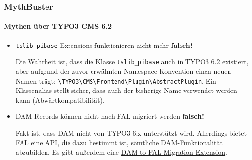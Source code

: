 \begin{frame}[fragile]
	\frametitle{MythBuster}
	\framesubtitle{Mythen über TYPO3 CMS 6.2}

	\begin{itemize}

		\item \texttt{tslib\_pibase}-Extensions funktionieren nicht mehr
			\tabto{9cm}\color{red}\textbf{\textrightarrow falsch!}\color{black}

			\smaller
				Die Wahrheit ist, dass die Klasse \texttt{tslib\_pibase} auch in TYPO3 6.2 existiert, aber aufgrund der zuvor erwähnten Namespace-Konvention einen neuen Namen trägt: \texttt{\textbackslash TYPO3\textbackslash CMS\textbackslash Frontend\textbackslash Plugin\textbackslash AbstractPlugin}.\newline
				Ein Klassenalias stellt sicher, dass auch der bisherige Name verwendet werden kann (Abwärtkompatibilität).
			\normalsize
			\newline

		\item DAM Records können nicht nach FAL migriert werden
			\tabto{9cm}\color{red}\textbf{\textrightarrow falsch!}\color{black}

			\smaller
				Fakt ist, dass DAM nicht von TYPO3 6.x unterstützt wird. Allerdings bietet FAL eine API, die dazu bestimmt ist, sämtliche DAM-Funktionalität abzubilden. Es gibt außerdem eine \href{https://github.com/fnagel/t3ext-dam_falmigration}{DAM-to-FAL Migration Extension}.
			\normalsize

	\end{itemize}

\end{frame}


